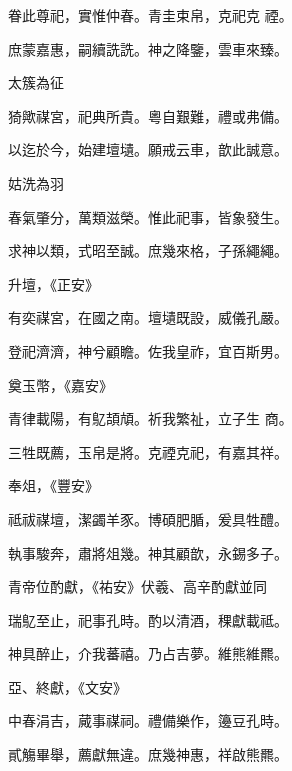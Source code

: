 \begin{pinyinscope}
 眷此尊祀，實惟仲春。青圭束帛，克祀克
 禋。



 庶蒙嘉惠，嗣續詵詵。神之降鑒，雲車來臻。



 太簇為征



 猗歟禖宮，祀典所貴。粵自艱難，禮或弗備。



 以迄於今，始建壇壝。願戒云車，歆此誠意。



 姑洗為羽



 春氣肇分，萬類滋榮。惟此祀事，皆象發生。



 求神以類，式昭至誠。庶幾來格，子孫繩繩。



 升壇，《正安》



 有奕禖宮，在國之南。壇壝既設，威儀孔嚴。



 登祀濟濟，神兮顧瞻。佐我皇祚，宜百斯男。



 奠玉幣，《嘉安》



 青律載陽，有鳦頡頏。祈我繁祉，立子生
 商。



 三牲既薦，玉帛是將。克禋克祀，有嘉其祥。



 奉俎，《豐安》



 祗祓禖壇，潔蠲羊豕。博碩肥腯，爰具牲醴。



 執事駿奔，肅將俎幾。神其顧歆，永錫多子。



 青帝位酌獻，《祐安》伏羲、高辛酌獻並同



 瑞鳦至止，祀事孔時。酌以清酒，稞獻載祗。



 神具醉止，介我蕃禧。乃占吉夢。維熊維羆。



 亞、終獻，《文安》



 中春涓吉，蕆事禖祠。禮備樂作，籩豆孔時。



 貳觴畢舉，薦獻無違。庶幾神惠，祥啟熊羆。




\end{pinyinscope}
